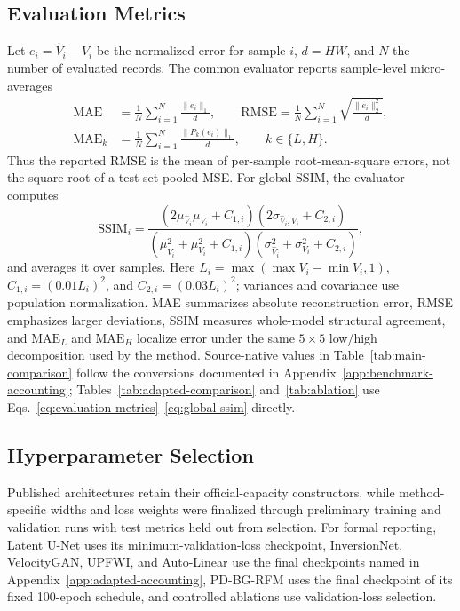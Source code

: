 \subsection{Evaluation Metrics}
Let $e_i=\hat V_i-V_i$ be the normalized error for sample $i$, $d=HW$, and $N$ the number of evaluated records. The common evaluator reports sample-level micro-averages
\begin{align}
\mathrm{MAE}
&=\frac{1}{N}\sum_{i=1}^{N}\frac{\|e_i\|_1}{d},\qquad
\mathrm{RMSE}
=\frac{1}{N}\sum_{i=1}^{N}\sqrt{\frac{\|e_i\|_2^2}{d}},\nonumber\\
\mathrm{MAE}_{k}
&=\frac{1}{N}\sum_{i=1}^{N}\frac{\|P_k(e_i)\|_1}{d},
\qquad k\in\{L,H\}.
\label{eq:evaluation-metrics}
\end{align}
Thus the reported RMSE is the mean of per-sample root-mean-square errors, not the square root of a test-set pooled MSE. For global SSIM, the evaluator computes
\begin{equation}
\mathrm{SSIM}_i=
\frac{(2\mu_{\hat V_i}\mu_{V_i}+C_{1,i})(2\sigma_{\hat V_i,V_i}+C_{2,i})}
{(\mu_{\hat V_i}^2+\mu_{V_i}^2+C_{1,i})(\sigma_{\hat V_i}^2+\sigma_{V_i}^2+C_{2,i})},
\label{eq:global-ssim}
\end{equation}
and averages it over samples. Here $L_i=\max(\max V_i-\min V_i,1)$, $C_{1,i}=(0.01L_i)^2$, and $C_{2,i}=(0.03L_i)^2$; variances and covariance use population normalization. MAE summarizes absolute reconstruction error, RMSE emphasizes larger deviations, SSIM measures whole-model structural agreement, and $\mathrm{MAE}_L$ and $\mathrm{MAE}_H$ localize error under the same $5\times5$ low/high decomposition used by the method. Source-native values in Table~\ref{tab:main-comparison} follow the conversions documented in Appendix~\ref{app:benchmark-accounting}; Tables~\ref{tab:adapted-comparison} and~\ref{tab:ablation} use Eqs.~\ref{eq:evaluation-metrics}--\ref{eq:global-ssim} directly.

\subsection{Hyperparameter Selection}
Published architectures retain their official-capacity constructors, while method-specific widths and loss weights were finalized through preliminary training and validation runs with test metrics held out from selection. For formal reporting, Latent U-Net uses its minimum-validation-loss checkpoint, InversionNet, VelocityGAN, UPFWI, and Auto-Linear use the final checkpoints named in Appendix~\ref{app:adapted-accounting}, PD-BG-RFM uses the final checkpoint of its fixed 100-epoch schedule, and controlled ablations use validation-loss selection.


